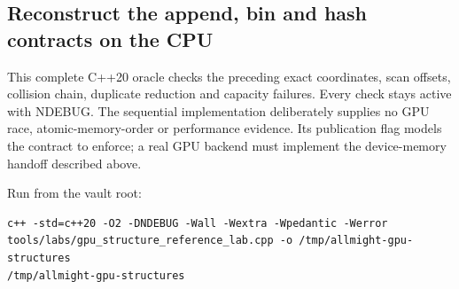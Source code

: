 \subsection{Reconstruct the append, bin and hash contracts on the CPU}\label{03-visual-computing-i-ch016-reconstruct-the-append-bin-and-hash-contracts-on-the-cpu}

This complete C++20 oracle checks the preceding exact coordinates, scan offsets, collision chain, duplicate reduction and capacity failures. Every check stays active with NDEBUG. The sequential implementation deliberately supplies no GPU race, atomic-memory-order or performance evidence. Its publication flag models the contract to enforce; a real GPU backend must implement the device-memory handoff described above.

Run from the vault root:

\begin{verbatim}
c++ -std=c++20 -O2 -DNDEBUG -Wall -Wextra -Wpedantic -Werror tools/labs/gpu_structure_reference_lab.cpp -o /tmp/allmight-gpu-structures
/tmp/allmight-gpu-structures
\end{verbatim}

